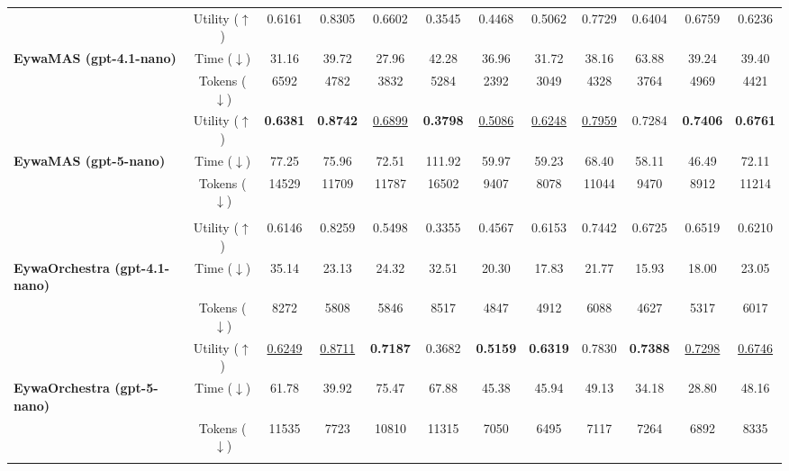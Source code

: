\begin{table}[!t]
{\begin{tabular}{l|c|ccc|ccc|ccc|c}
        \addlinespace[-0.4ex] \midrule \addlinespace[-0.000ex]
        \multicolumn{12}{c}{
            \rule{0pt}{1.1em}
            \textbf{\textit{Multi-Agent Setting}}
            \rule[-0.3em]{0pt}{1.1em}
        } \\
        [-0.4ex]\midrule\addlinespace[-0.000ex]
        & Utility ($\uparrow$)   & 0.6161 & 0.8305 & 0.6602 & 0.3545 & 0.4468 & 0.5062 & 0.7729 & 0.6404 & 0.6759 & 0.6236\\
        \textbf{EywaMAS (gpt-4.1-nano)}
        & Time ($\downarrow$)  & 31.16 & 39.72 & 27.96 & 42.28 & 36.96 & 31.72 & 38.16 & 63.88 & 39.24 & 39.40\\
        & Tokens ($\downarrow$) & 6592 & 4782 & 3832 & 5284 & 2392 & 3049 & 4328 & 3764 & 4969 & 4421\\
        [-0.4ex]\midrule\addlinespace[-0.000ex]
        & Utility ($\uparrow$)   & \textbf{0.6381} & \textbf{0.8742} & \underline{0.6899} & \textbf{0.3798} & \underline{0.5086} & \underline{0.6248} & \underline{0.7959} & 0.7284 & \textbf{0.7406} & \textbf{0.6761}\\
        \textbf{EywaMAS (gpt-5-nano)}
        & Time ($\downarrow$)  & 77.25 & 75.96 & 72.51 & 111.92 & 59.97 & 59.23 & 68.40 & 58.11 & 46.49 & 72.11\\
        & Tokens ($\downarrow$) & 14529 & 11709 & 11787 & 16502 & 9407 & 8078 & 11044 & 9470 & 8912 & 11214\\

        \addlinespace[-0.4ex] \midrule \addlinespace[-0.000ex]
        \multicolumn{12}{c}{
            \rule{0pt}{1.1em}
            \textbf{\textit{Dynamic Orchestration}}
            \rule[-0.3em]{0pt}{1.1em}
        } \\
        [-0.4ex]\midrule\addlinespace[-0.000ex]
        & Utility ($\uparrow$)   & 0.6146 & 0.8259 & 0.5498 & 0.3355 & 0.4567 & 0.6153 & 0.7442 & 0.6725 & 0.6519 & 0.6210\\
        \textbf{EywaOrchestra (gpt-4.1-nano)}
        & Time ($\downarrow$)  & 35.14 & 23.13 & 24.32 & 32.51 & 20.30 & 17.83 & 21.77 & 15.93 & 18.00 & 23.05\\
        & Tokens ($\downarrow$) & 8272 & 5808 & 5846 & 8517 & 4847 & 4912 & 6088 & 4627 & 5317 & 6017\\
        [-0.4ex]\midrule\addlinespace[-0.000ex]
        & Utility ($\uparrow$)   & \underline{0.6249} & \underline{0.8711} & \textbf{0.7187} & 0.3682 & \textbf{0.5159} & \textbf{0.6319} & 0.7830 & \textbf{0.7388} & \underline{0.7298} & \underline{0.6746}\\
        \textbf{EywaOrchestra (gpt-5-nano)}
        & Time ($\downarrow$)  & 61.78 & 39.92 & 75.47 & 67.88 & 45.38 & 45.94 & 49.13 & 34.18 & 28.80 & 48.16\\
        & Tokens ($\downarrow$) & 11535 & 7723 & 10810 & 11315 & 7050 & 6495 & 7117 & 7264 & 6892 & 8335\\
        [-0.4ex]\bottomrule\addlinespace[-0.000ex]
    \end{tabular}
    }
    \vspace{-4pt}
\end{table}
